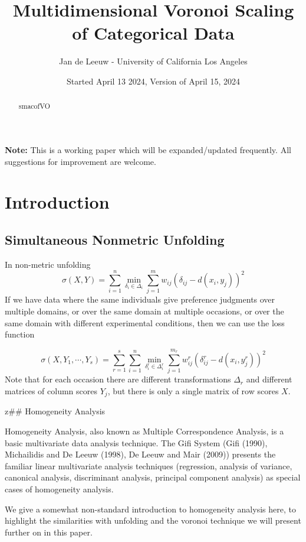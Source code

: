 \documentclass[
  12pt,
]{article}
\title{Multidimensional Voronoi Scaling of Categorical Data}
\author{Jan de Leeuw - University of California Los Angeles}
\date{Started April 13 2024, Version of April 15, 2024}
\begin{document}
\maketitle
\begin{abstract}
smacofVO
\end{abstract}

{
\setcounter{tocdepth}{3}
\tableofcontents
}
\textbf{Note:} This is a working paper which will be expanded/updated frequently. All suggestions for improvement are welcome.

\section{Introduction}\label{introduction}

\subsection{Simultaneous Nonmetric Unfolding}\label{simultaneous-nonmetric-unfolding}

In non-metric unfolding
\[
\sigma(X,Y)=\sum_{i=1}^n\min_{\delta_i\in\Delta_i}\sum_{j=1}^mw_{ij}(\delta_{ij}-d(x_i,y_j))^2
\]
If we have data where the same individuals give preference
judgments over multiple domains, or over the same domain at multiple occasions, or over the same domain with different experimental conditions,
then we can use the loss function

\[
\sigma(X,Y_1,\cdots,Y_s)=\sum_{r=1}^s\sum_{i=1}^n\min_{\delta_i^r\in\Delta_i^r}\sum_{j=1}^{m_r}w_{ij}^r(\delta_{ij}^r-d(x_i,y_j^r))^2
\]
Note that for each occasion there are different transformations \(\Delta_r\)
and different matrices of column scores \(Y_j\), but there is only a single matrix of row scores \(X\).

z\#\# Homogeneity Analysis

Homogeneity Analysis, also known as Multiple Correspondence Analysis,
is a basic multivariate data analysis technique. The Gifi System (Gifi (1990), Michailidis and De Leeuw (1998), De Leeuw and Mair (2009)) presents the familiar linear multivariate analysis techniques (regression, analysis of variance, canonical analysis, discriminant analysis, principal component analysis) as special cases of homogeneity analysis.

We give a somewhat non-standard introduction to homogeneity analysis here, to highlight the
similarities with unfolding and the voronoi technique we will present further on in this paper.
\end{document}
